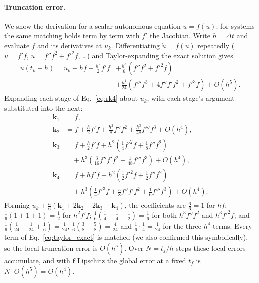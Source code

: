 \documentclass[11pt]{article}
\newcommand{\bff}{\mathbf{f}}
\begin{document}
\paragraph{Truncation error.} We show the derivation for a scalar autonomous equation $\dot u = f(u)$; for systems the same matching holds term by term with $f'$ the Jacobian. Write $h = \Delta t$ and evaluate $f$ and its derivatives at $u_k$. Differentiating $\dot u = f(u)$ repeatedly ($\ddot u = f'f$, $\dddot u = f''f^2 + f'^2 f$, \dots) and Taylor-expanding the exact solution gives
\begin{equation}
\label{eq:taylor_exact}
\begin{aligned}
u(t_k + h) = u_k + hf + \frac{h^2}{2}f'f &+ \frac{h^3}{6}\left(f''f^2 + f'^2 f\right) \\
&+ \frac{h^4}{24}\left(f'''f^3 + 4f''f'f^2 + f'^3 f\right) + O(h^5).
\end{aligned}
\end{equation}
Expanding each stage of Eq.~\eqref{eq:rk4} about $u_k$, with each stage's argument substituted into the next:
\begin{equation}
\begin{aligned}
\mathbf{k}_1 &= f, \\
\mathbf{k}_2 &= f + \tfrac{h}{2}f'f + \tfrac{h^2}{8}f''f^2 + \tfrac{h^3}{48}f'''f^3 + O(h^4), \\
\mathbf{k}_3 &= f + \tfrac{h}{2}f'f + h^2\left(\tfrac14 f'^2 f + \tfrac18 f''f^2\right) \\ &\quad + h^3\left(\tfrac{3}{16}f''f'f^2 + \tfrac{1}{48}f'''f^3\right) + O(h^4), \\
\mathbf{k}_4 &= f + hf'f + h^2\left(\tfrac12 f'^2 f + \tfrac12 f''f^2\right) \\ &\quad + h^3\left(\tfrac14 f'^3 f + \tfrac58 f''f'f^2 + \tfrac16 f'''f^3\right) + O(h^4).
\end{aligned}
\end{equation}
Forming $u_k + \tfrac{h}{6}(\mathbf{k}_1 + 2\mathbf{k}_2 + 2\mathbf{k}_3 + \mathbf{k}_4)$, the coefficients are $\tfrac{6}{6} = 1$ for $hf$; $\tfrac{1}{6}(1 + 1 + 1) = \tfrac12$ for $h^2 f'f$; $\tfrac16(\tfrac14 + \tfrac14 + \tfrac12) = \tfrac16$ for both $h^3 f''f^2$ and $h^3 f'^2 f$; and $\tfrac16(\tfrac1{24} + \tfrac1{24} + \tfrac16) = \tfrac1{24}$, $\tfrac16(\tfrac38 + \tfrac58) = \tfrac4{24}$ and $\tfrac16\cdot\tfrac14 = \tfrac1{24}$ for the three $h^4$ terms. Every term of Eq.~\eqref{eq:taylor_exact} is matched (we also confirmed this symbolically), so the local truncation error is $O(h^5)$. Over $N = t_f/h$ steps these local errors accumulate, and with $\bff$ Lipschitz the global error at a fixed $t_f$ is $N \cdot O(h^5) = O(h^4)$.
\end{document}
